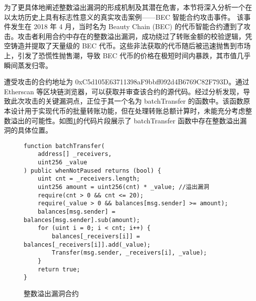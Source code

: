 \documentclass[print, master, vlined, timesmath]{DissertUESTC}
\begin{document}

为了更具体地阐述整数溢出漏洞的形成机制及其潜在危害，本节将深入分析一个在以太坊历史上具有标志性意义的真实攻击案例——BEC 智能合约攻击事件。
该事件发生在 2018 年 4 月，当时名为 Beauty Chain (BEC) 的代币智能合约遭到了攻击。攻击者利用合约中存在的整数溢出漏洞，成功绕过了转账金额的校验逻辑，凭空铸造并提取了天量级的 BEC 代币。这些非法获取的代币随后被迅速抛售到市场上，引发了恐慌性抛售潮，导致 BEC 代币的价格在极短时间内暴跌，其市值几乎瞬间蒸发归零\textsuperscript{\cite{becattack}}。

遭受攻击的合约地址为 0xC5d105E63711398aF9bbff092d4B6769C82F793D。通过 Etherscan 等区块链浏览器，可以获取并审查该合约的源代码。经过分析发现，导致此次攻击的关键漏洞点，正位于其一个名为 batchTransfer 的函数中。该函数原本设计用于实现代币的批量转账功能，但在处理转账总额计算时，未能充分考虑整数溢出的可能性。如图\ref{fig:整数溢出漏洞合约}的代码片段展示了 batchTransfer 函数中存在整数溢出漏洞的具体位置。


\begin{figure}[H]
    \centering
    \begin{minipage}{0.9\textwidth}
    \begin{verbatim}
function batchTransfer(
    address[] _receivers, 
    uint256 _value
) public whenNotPaused returns (bool) {
    uint cnt = _receivers.length;
    uint256 amount = uint256(cnt) * _value; //溢出漏洞
    require(cnt > 0 && cnt <= 20);
    require(_value > 0 && balances[msg.sender] >= amount);
    balances[msg.sender] = balances[msg.sender].sub(amount);
    for (uint i = 0; i < cnt; i++) {
        balances[_receivers[i]] = balances[_receivers[i]].add(_value);
        Transfer(msg.sender, _receivers[i], _value);
    }
    return true;
}
    \end{verbatim}
    \end{minipage}
    \caption{整数溢出漏洞合约}
    \label{fig:整数溢出漏洞合约}
\end{figure}


\end{document}
